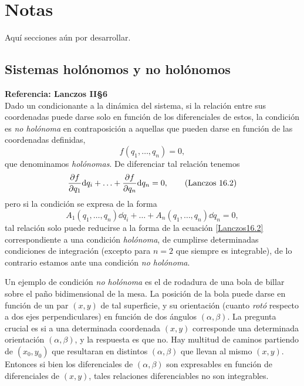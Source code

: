 \documentclass[12pt, spanish, a4paper, ]{article}
\begin{document}
\appendix

\section{Notas}
Aquí secciones aún por desarrollar.



\subsection{Sistemas holónomos y no holónomos} 
\textbf{Referencia: Lanczos II\S6}\\

Dado un condicionante a la dinámica del sistema, si la relación entre sus coordenadas puede darse solo en función de los diferenciales de estos, la condición es \emph{no holónoma} en contraposición a aquellas que pueden darse en función de las coordenadas definidas, 
\begin{equation}\label{Lanczos16.1}
	f(q_1,\ldots,q_n) =0,
	\tag{Lanczos 16.1}
\end{equation}
que denominamos \emph{holónomas}.
De diferenciar tal relación tenemos 
\begin{equation}\label{Lanczos16.2}
	\pdv{f}{q_1} \dd q_i+\ldots+ \pdv{f}{q_n} \dd q_n =0,
	\tag{Lanczos 16.2}
\end{equation} 
pero si la condición se expresa de la forma
\begin{equation}\label{Lanczos16.3}
	A_1(q_1,\ldots,q_n) \dd q_i+\ldots+ A_n(q_1,\ldots,q_n) \dd q_n =0,
	\tag{Lanczos 16.3}
\end{equation} 
tal relación solo puede reducirse a la forma de la ecuación \eqref{Lanczos16.2} correspondiente a una condición \emph{holónoma}, de cumplirse determinadas condiciones de integración (excepto para \(n=2\) que siempre es integrable), de lo contrario estamos ante una condición \emph{no holónoma}. 

Un ejemplo de condición \emph{no holónoma} es el de rodadura de una bola de billar sobre el paño bidimensional de la mesa.
La posición de la bola puede darse en función de un par \((x,y)\) de tal superficie, y su orientación (cuanto \emph{rotó} respecto a dos ejes perpendiculares) en función de dos ángulos \((\alpha, \beta)\).
La pregunta crucial es si a una determinada coordenada \((x,y)\) corresponde una determinada orientación \((\alpha, \beta)\), y la respuesta es que no.
Hay multitud de caminos partiendo de \((x_0,y_0)\) que resultaran en distintos \((\alpha, \beta)\) que llevan al mismo \((x,y)\).
Entonces si bien los diferenciales de \((\alpha, \beta)\) son expresables en función de diferenciales de \((x,y)\), tales relaciones diferenciables no son integrables.
\end{document}
